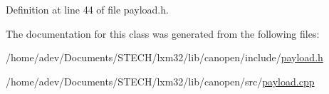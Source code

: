 Definition at line 44 of file payload.\+h.



The documentation for this class was generated from the following files\+:\begin{DoxyCompactItemize}
\item 
/home/adev/\+Documents/\+S\+T\+E\+C\+H/lxm32/lib/canopen/include/\hyperlink{payload_8h}{payload.\+h}\item 
/home/adev/\+Documents/\+S\+T\+E\+C\+H/lxm32/lib/canopen/src/\hyperlink{payload_8cpp}{payload.\+cpp}\end{DoxyCompactItemize}
